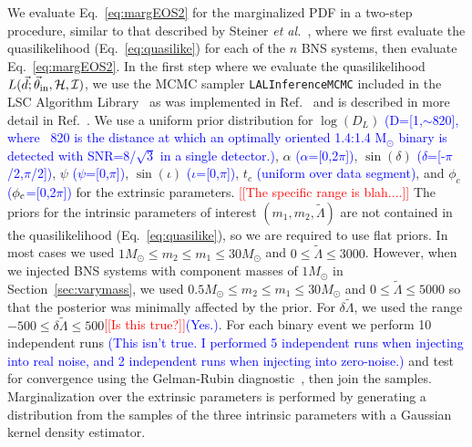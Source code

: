 \documentclass[twocolumn,prd,amssymb,aps,nofootinbib,showpacs,epsf]{revtex4}
\newcommand{\red}{\textcolor{red}}
\newcommand\les[2]{\textcolor{blue}{{#1}\sout{#2}}}
\begin{document}
We evaluate Eq.~\eqref{eq:margEOS2} for the marginalized PDF in a two-step procedure, similar to that described by Steiner {\it et al.}~\cite{SteinerLattimerBrown2010}, where we first evaluate the quasilikelihood (Eq.~\eqref{eq:quasilike}) for each of the $n$ BNS systems, then evaluate Eq.~\eqref{eq:margEOS2}. In the first step where we evaluate the quasilikelihood $L(\vec d; \vec\theta_{\rm in}, \mathcal{H}, \mathcal{I})$, we use the MCMC sampler \texttt{LALInferenceMCMC} included in the LSC Algorithm Library~\cite{lal} as was implemented in Ref.~\cite{WadeCreightonOchsner2014} and is described in more detail in Ref.~\cite{VanDerSluysRaymondMandel2008}. We use a uniform prior distribution for $\log(D_L)$ \les{(D=[1,$\sim$820], where ~820 is the distance at which an optimally oriented 1.4:1.4 M$_\odot$ binary is detected with SNR=8/$\sqrt{3}$ in a single detector.)}{}, $\alpha$ \les{($\alpha$=[0,2$\pi$])}{}, $\sin(\delta)$ \les{($\delta$=[-$\pi$/2,$\pi$/2])}{}, $\psi$ \les{($\psi$=[0,$\pi$])}{}, $\sin(\iota)$ \les{($\iota$=[0,$\pi$])}{}, $t_c$ \les{(uniform over data segment)}{}, and $\phi_c$ \les{($\phi_{\rm c}$=[0,2$\pi$])}{} for the extrinsic parameters. \red{[[The specific range is blah....]]} The priors for the intrinsic parameters of interest $(m_{1}, m_{2}, \tilde\Lambda)$ are not contained in the quasilikelihood (Eq.~\eqref{eq:quasilike}), so we are required to use flat priors. In most cases we used $1M_\odot \le m_2 \le m_1 \le 30M_\odot$ and $0 \le \tilde\Lambda \le 3000$. However, when we injected BNS systems with component masses of $1M_\odot$ in Section~\ref{sec:varymass}, we used $0.5M_\odot \le m_2 \le m_1 \le 30M_\odot$ and $0 \le \tilde\Lambda \le 5000$ so that the posterior was minimally affected by the prior. For $\delta\tilde\Lambda$, we used the range $-500 \le \delta\tilde\Lambda \le 500$\red{[[Is this true?]]}\les{(Yes.)}{}. For each binary event we perform 10 independent runs \les{(This isn't true.  I performed 5 independent runs when injecting into real noise, and 2 independent runs when injecting into zero-noise.)}{} and test for convergence using the Gelman-Rubin diagnostic~\cite{GelmanRubin1992}, then join the samples. Marginalization over the extrinsic parameters is performed by generating a distribution from the samples of the three intrinsic parameters with a Gaussian kernel density estimator. 
\end{document}
